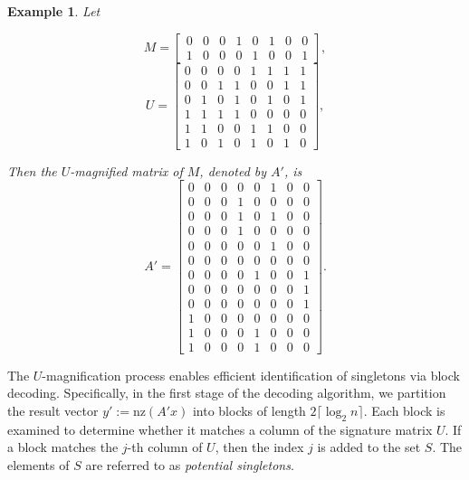 \documentclass{article}
\newtheorem{example}{Example}[subsection]
\newcommand{\nz}{\mathrm{nz}}
\begin{document}
\begin{example}\label{exp:matrices}
Let

\[
M=\begin{bmatrix}
0&0&0&1&0&1&0&0\\
1&0&0&0&1&0&0&1
\end{bmatrix}, \]
\[
U=\begin{bmatrix}
0&0&0&0&1&1&1&1\\
0&0&1&1&0&0&1&1\\
0&1&0&1&0&1&0&1\\
1&1&1&1&0&0&0&0\\
1&1&0&0&1&1&0&0\\
1&0&1&0&1&0&1&0
\end{bmatrix}
,
\]

Then the $U$-magnified matrix of $M$, denoted by $A'$, is
\[
A'=\begin{bmatrix}
0&0&0&0&0&1&0&0\\
0&0&0&1&0&0&0&0\\
0&0&0&1&0&1&0&0\\
0&0&0&1&0&0&0&0\\
0&0&0&0&0&1&0&0\\
0&0&0&0&0&0&0&0\\
0&0&0&0&1&0&0&1\\
0&0&0&0&0&0&0&1\\
0&0&0&0&0&0&0&1\\
1&0&0&0&0&0&0&0\\
1&0&0&0&1&0&0&0\\
1&0&0&0&1&0&0&0
\end{bmatrix}
.
\]
\end{example}

The $U$-magnification process enables efficient identification of singletons via block decoding. Specifically, in the first stage of the decoding algorithm, we partition the result vector $y':=\nz(A'x)$ into blocks of length $2\lceil \log_2 n\rceil$. Each block is examined to determine whether it matches a column of the signature matrix $U$. If a block matches the $j$-th column of $U$, then the index $j$ is added to the set $S$. The elements of $S$ are referred to as \emph{potential singletons}.
\end{document}
